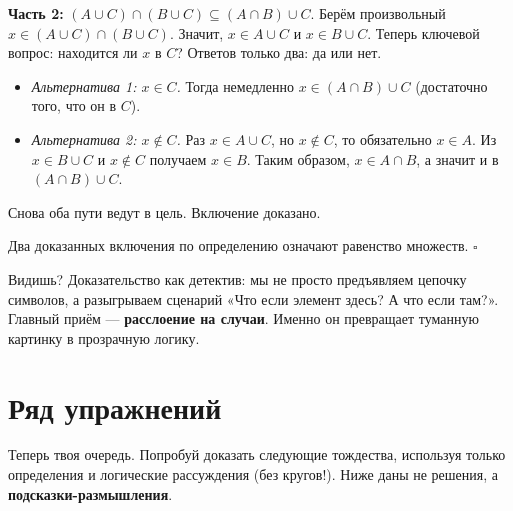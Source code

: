 \textbf{Часть 2:} $(A \cup C) \cap (B \cup C) \subseteq (A \cap B) \cup C$.
Берём произвольный $x \in (A \cup C) \cap (B \cup C)$. Значит, $x \in A \cup C$ и $x \in B \cup C$. Теперь ключевой вопрос: находится ли $x$ в $C$? Ответов только два: да или нет.
\begin{itemize}
  \item \textit{Альтернатива 1: $x \in C$.} Тогда немедленно $x \in (A \cap B) \cup C$ (достаточно того, что он в $C$).
  \item \textit{Альтернатива 2: $x \notin C$.} Раз $x \in A \cup C$, но $x \notin C$, то обязательно $x \in A$. Из $x \in B \cup C$ и $x \notin C$ получаем $x \in B$. Таким образом, $x \in A \cap B$, а значит и в $(A \cap B) \cup C$.
\end{itemize}
Снова оба пути ведут в цель. Включение доказано.

Два доказанных включения по определению означают равенство множеств. $\square$

Видишь? Доказательство как детектив: мы не просто предъявляем цепочку символов, а разыгрываем сценарий «Что если элемент здесь? А что если там?». Главный приём — \textbf{расслоение на случаи}. Именно он превращает туманную картинку в прозрачную логику.

\section{Ряд упражнений}
\label{sec:exercises-ch1}

Теперь твоя очередь. Попробуй доказать следующие тождества, используя только определения и логические рассуждения (без кругов!). Ниже даны не решения, а \textbf{подсказки-размышления}.

